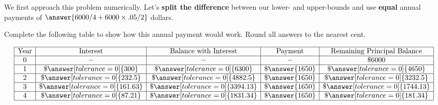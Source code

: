 \documentclass[handout,space,nooutcomes]{ximera}
\begin{document}
\newpage
\begin{question}[1in]
We first approach this problem numerically.  Let's \textbf{split the difference} between our lower- and upper-bounds and use  
\textbf{equal} annual payments of $\answer{6000/4 + 6000\times.05/2}$ dollars.  

Complete the following table to show how this annual payment would work.  Round all answers to the nearest cent.


\[
  \begin{array}{|c|c|c|c|c|}
    \hline
    \text{Year} & \text{Interest}             & \text{Balance with Interest} & \text{Payment}    & \text{Remaining Principal Balance}\\ \hline
    0  &  -               & -                  &  -     & \$ 6000 \\ \hline
    1  & \$ \answer[tolerance=0]{300}    & \$ \answer[tolerance=0]{6300}    & \$ \answer{1650}  & \$ \answer[tolerance=0]{4650} \\ \hline
    2  & \$ \answer[tolerance=0]{232.5}    & \$ \answer[tolerance=0]{4882.5}    & \$ \answer{1650}  & \$ \answer[tolerance=0]{3232.5} \\ \hline
    3  & \$ \answer[tolerance=0]{161.63} & \$ \answer[tolerance=0]{3394.13} & \$ \answer{1650}  & \$ \answer[tolerance=0]{1744.13} \\ \hline
    4  & \$ \answer[tolerance=0]{87.21} & \$ \answer[tolerance=0]{1831.34} & \$ \answer{1650}  & \$ \answer[tolerance=0]{181.34} \\ \hline
  \end{array}
\]

\end{question}
\end{document}

